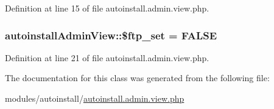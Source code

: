 Definition at line 15 of file autoinstall.\+admin.\+view.\+php.

\hypertarget{classautoinstallAdminView_a2b4389cba13f2fc27c57adb8b597a56f}{
\subsubsection[{\$ftp\+\_\+set}]{\setlength{\rightskip}{0pt plus 5cm}autoinstall\+Admin\+View\+::\$ftp\+\_\+set = F\+A\+L\+S\+E}}\label{classautoinstallAdminView_a2b4389cba13f2fc27c57adb8b597a56f}


Definition at line 21 of file autoinstall.\+admin.\+view.\+php.



The documentation for this class was generated from the following file\+:\begin{DoxyCompactItemize}
\item 
modules/autoinstall/\hyperlink{autoinstall_8admin_8view_8php}{autoinstall.\+admin.\+view.\+php}\end{DoxyCompactItemize}
